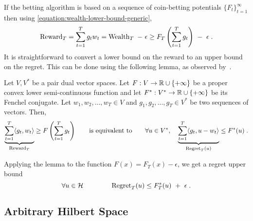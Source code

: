 If the betting algorithm is based on a sequence of coin-betting potentials
$\{F_t\}_{t=1}^\infty$ then using \eqref{equation:wealth-lower-bound-generic},
\begin{equation}
\label{equation:one-dimensional-olo-reward-lower-bound}
\Reward_T
= \sum_{t=1}^T g_t w_t
= \Wealth_T \ - \ \epsilon \ge F_T\left(\sum_{t=1}^T g_t \right) \ - \ \epsilon \; .
\end{equation}
It is straightforward to convert a lower bound on the reward to an upper bound
on the regret. This can be done using the following lemma, as observed
by~\cite{McMahanO14}.
\begin{lemma}
\label{lemma:reward-regret}
Let $V,V^*$ be a pair dual vector spaces. Let $F:V \to \mathbb{R} \cup \{+\infty\}$ be a
proper convex lower semi-continuous function and let $F^*:V^* \to \mathbb{R} \cup
\{+\infty\}$ be its Fenchel conjugate. Let $w_1, w_2, \dots, w_T \in V$ and
$g_1, g_2, \dots, g_T \in V^*$ be two sequences of vectors.  Then,
$$
\underbrace{\sum_{t=1}^T \langle g_t, w_t \rangle}_{\operatorname{Reward}_T} \ge F\left( \sum_{t=1}^T g_t \right)
\qquad \text{is equivalent to} \qquad
\forall u \in V^*, \quad
\underbrace{\sum_{t=1}^T \langle g_t, u - w_t\rangle}_{\operatorname{Regret}_T(u)} \le F^*(u) \; .
$$
\end{lemma}

Applying the lemma to the function $F(x) = F_T(x) - \epsilon$, we get a regret
upper bound
$$
\forall u \in \mathcal{H} \qquad \qquad
\operatorname{Regret}_T(u) \le F_T^*(u) \ + \ \epsilon \; .
$$

\subsection{Arbitrary Hilbert Space}

